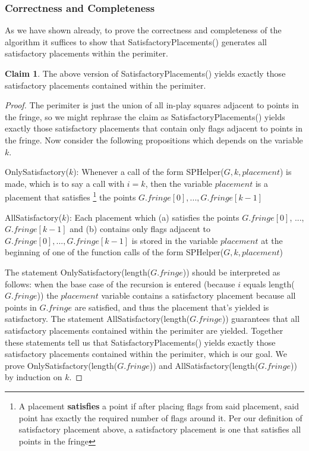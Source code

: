 \documentclass{article}
\theoremstyle{definition}
\theoremstyle{definition}
\theoremstyle{theorem}
\newtheorem{claim}{Claim}
\begin{document}
	\subsubsection{Correctness and Completeness}
	As we have shown already, to prove the correctness and completeness of the algorithm it suffices to show that SatisfactoryPlacements() generates all satisfactory placements within the perimiter.
	\begin{claim}
		The above version of SatisfactoryPlacements() yields exactly those satisfactory placements contained within the perimiter.
	\end{claim}
	\begin{proof}
		The perimiter is just the union of all in-play squares adjacent to points in the fringe, so we might rephrase the claim as SatisfactoryPlacements() yields exactly those satisfactory placements that contain only flags adjacent to points in the fringe. Now consider the following propositions which depends on the variable $k$.
		
		\bigskip
		OnlySatisfactory($k$): Whenever a call of the form SPHelper($G,k,placement$) is made, which is to say a call with $i = k$, then the variable $placement$ is a placement that satisfies \footnote{A placement \textbf{satisfies} a point if after placing flags from said placement, said point has exactly the required number of flags around it. Per our definition of satisfactory placement above, a satisfactory placement is one that satisfies all points in the fringe} the points $G.fringe[0],...,G.fringe[k-1]$
	
		\bigskip
		 AllSatisfactory($k$): Each placement which (a) satisfies the points $G.fringe[0]$, ...,$G.fringe[k-1]$ and (b) contains only flags adjacent to $G.fringe[0], ..., G.fringe[k-1]$ is stored in the variable $placement$ at the beginning of one of the function calls of the form SPHelper($G,k,placement$)
		 
		 \bigskip
		 The statement OnlySatisfactory(length($G.fringe$)) should be interpreted as follows: when the base case of the recursion is entered (because $i$ equals length($G.fringe$)) the $placement$ variable contains a satisfactory placement because all points in $G.fringe$ are satisfied, and thus the placement that's yielded is satisfactory. The statement AllSatisfactory(length($G.fringe$)) guarantees  that all satisfactory placements contained within the perimiter are yielded. Together these statements tell us that SatisfactoryPlacements() yields exactly those satisfactory placements contained within the perimiter, which is our goal. We prove OnlySatisfactory(length($G.fringe$)) and AllSatisfactory(length($G.fringe$)) by induction on $k$.
		 

\end{proof}
\end{document}
